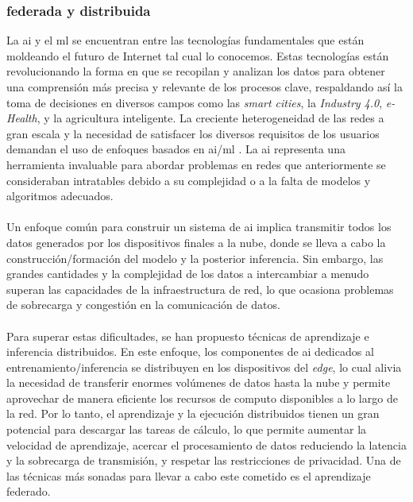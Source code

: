 \subsubsection{ federada y distribuida}

La \gls{ai} y el \gls{ml} se encuentran entre las tecnologías fundamentales que están moldeando el futuro de Internet tal cual lo conocemos. Estas tecnologías están revolucionando la forma en que se recopilan y analizan los datos para obtener una comprensión más precisa y relevante de los procesos clave, respaldando así la toma de decisiones en diversos campos como las \textit{smart cities}, la \textit{Industry 4.0}, \textit{e-Health}, y la agricultura inteligente. La creciente heterogeneidad de las redes a gran escala y la necesidad de satisfacer los diversos requisitos de los usuarios demandan el uso de enfoques basados en \gls{ai}/\gls{ml} \cite{pan2021network}. La \gls{ai} representa una herramienta invaluable para abordar problemas en redes que anteriormente se consideraban intratables debido a su complejidad o a la falta de modelos y algoritmos adecuados. \\
\\
Un enfoque común para construir un sistema de \gls{ai} implica transmitir todos los datos generados por los dispositivos finales a la nube, donde se lleva a cabo la construcción/formación del modelo y la posterior inferencia. Sin embargo, las grandes cantidades y la complejidad de los datos a intercambiar a menudo superan las capacidades de la infraestructura de red, lo que ocasiona problemas de sobrecarga y congestión en la comunicación de datos.\\
\\
Para superar estas dificultades, se han propuesto técnicas de aprendizaje e inferencia distribuidos. En este enfoque, los componentes de \gls{ai} dedicados al entrenamiento/inferencia se distribuyen en los dispositivos del \textit{edge}, lo cual alivia la necesidad de transferir enormes volúmenes de datos hasta la nube y permite aprovechar de manera eficiente los recursos de computo disponibles a lo largo de la red.  Por lo tanto, el aprendizaje y la ejecución distribuidos tienen un gran potencial para descargar las tareas de cálculo, lo que permite aumentar la velocidad de aprendizaje, acercar el procesamiento de datos reduciendo la latencia y la sobrecarga de transmisión, y respetar las restricciones de privacidad. Una de las técnicas más sonadas para llevar a cabo este cometido es el aprendizaje federado. \\
